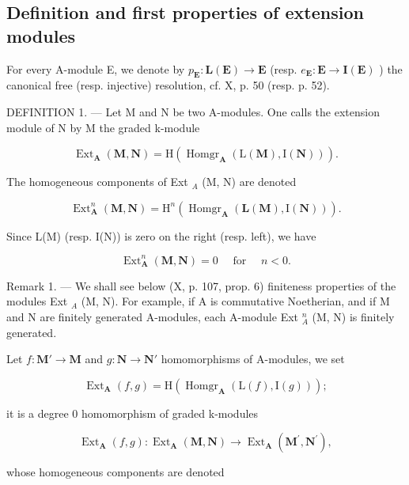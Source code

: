 \subsection{Definition and first properties of extension modules}

For every A-module E, we denote by \(p_{\mathbf{E}} : \mathbf{L}(\mathbf{E}) \to \mathbf{E}\) (resp. \(e_{\mathbf{E}} : \mathbf{E} \to \mathbf{I}(\mathbf{E})\) ) the canonical free (resp. injective) resolution, cf. X, p. 50 (resp. p. 52).

DEFINITION 1. --- Let M and N be two A-modules. One calls the extension module of N by M the graded k-module

\[
\operatorname{Ext} _ {\mathbf {A}} (\mathbf {M}, \mathbf {N}) = \mathrm{H} \left(\operatorname{Homgr} _ {\mathbf {A}} (\mathrm{L} (\mathbf {M}), \mathrm{I} (\mathbf {N}))\right).\tag{4}
\]

The homogeneous components of Ext \(_{A}\) (M, N) are denoted

\[
\operatorname{Ext} _ {\mathbf {A}} ^ {n} (\mathbf {M}, \mathbf {N}) = \mathrm{H} ^ {n} \left(\operatorname{Homgr} _ {\mathbf {A}} (\mathbf {L} (\mathbf {M}), \mathrm{I} (\mathbf {N}))\right).\tag{5}
\]

Since L(M) (resp. I(N)) is zero on the right (resp. left), we have

\[
\operatorname{Ext} _ {\mathbf {A}} ^ {n} (\mathbf {M}, \mathbf {N}) = 0 \quad \text { for } \quad n <   0.\tag{6}
\]

Remark 1. --- We shall see below (X, p. 107, prop. 6) finiteness properties of the modules Ext \(_{A}\) (M, N). For example, if A is commutative Noetherian, and if M and N are finitely generated A-modules, each A-module Ext \(_{A}^{n}\) (M, N) is finitely generated.

Let \(f: \mathbf{M}' \to \mathbf{M}\) and \(g: \mathbf{N} \to \mathbf{N}'\) homomorphisms of A-modules, we set

\[
\operatorname{Ext} _ {\mathbf {A}} (f, g) = \mathrm{H} \left(\operatorname{Homgr} _ {\mathbf {A}} (\mathrm{L} (f), \mathrm{I} (g))\right);
\]

it is a degree 0 homomorphism of graded k-modules

\[
\operatorname{Ext} _ {\mathbf {A}} (f, g): \operatorname{Ext} _ {\mathbf {A}} (\mathbf {M}, \mathbf {N}) \rightarrow \operatorname{Ext} _ {\mathbf {A}} \left(\mathbf {M} ^ {\prime}, \mathbf {N} ^ {\prime}\right),
\]

whose homogeneous components are denoted

